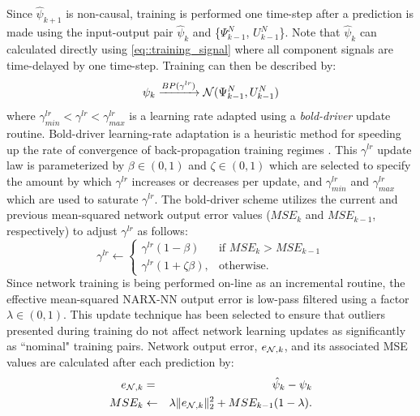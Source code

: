 			Since $\hat{\psi}_{k+1}$ is non-causal, training is performed one time-step after a prediction is made using the input-output pair $\hat{\psi}_{k}$ and \{${\Psi}_{k-1}^{N}$, ${U}_{k-1}^{N}$\}. Note that $\hat{\psi}_{k}$ can calculated directly using \ref{eq::training_signal} where all component signals are time-delayed by one time-step. Training can then be described by:
				\begin{equation}
					\psi_{k} \xrightarrow{BP(\gamma^{lr})} {\cal N}({\Psi}_{k-1}^{N},{U}_{k-1}^{N})
					\label{eq::training}
				\end{equation}
			where $\gamma^{lr} _{min} < \gamma^{lr} < \gamma^{lr} _{max}$ is a learning rate adapted using a \emph{bold-driver} update routine. Bold-driver learning-rate adaptation is a  heuristic method for speeding up the rate of convergence of back-propagation training regimes \cite{Battiti1992,Magoulas1999}. This $\gamma^{lr}$ update law is parameterized by $\beta \in (0,1)$ and $\zeta \in (0,1)$ which are selected to specify the amount by which $\gamma^{lr}$ increases or decreases per update, and $\gamma^{lr} _{min}$ and $\gamma^{lr} _{max}$ which are used to saturate $\gamma^{lr}$.  The bold-driver scheme utilizes the current and previous mean-squared network output error values ($MSE_{k}$ and $MSE_{k-1}$, respectively) to adjust $\gamma^{lr}$ as follows:
				\begin{equation}
				    \gamma^{lr} \leftarrow 
					\begin{cases}
				    \gamma^{lr} (1- \beta) 		& \text{if } MSE_{k} > MSE_{k-1}\\
				    \gamma^{lr} (1+\zeta \beta),& \text{otherwise}.
					\end{cases}
				\end{equation}
			Since network training is being performed on-line as an incremental routine, the effective mean-squared NARX-NN  output error is low-pass filtered using a factor $\lambda \in (0,1)$. This update technique has been selected to ensure that outliers presented during training do not affect network learning updates as significantly as ``nominal" training pairs. Network output error, $e_{{\cal N},k}$, and its associated MSE values are calculated after each prediction by:
				\begin{eqnarray}
					e_{{\cal N},k} 	&=& \hat{\psi}_{k} - \psi_{k} \nonumber\\
					MSE_{k} 		&\leftarrow& \lambda \|e_{{\cal N},k}\|_{2}^{2} + MSE_{k-1}(1-\lambda).
				\end{eqnarray}


